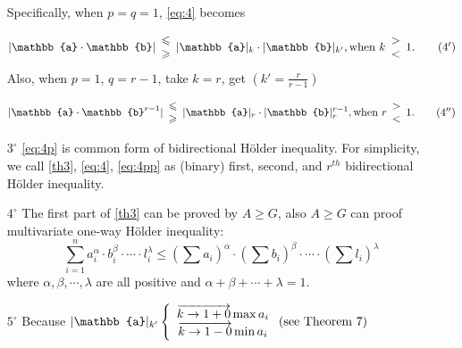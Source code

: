 \documentclass[12pt,a4paper,reqno]{amsart}
\theoremstyle{plain}
\theoremstyle{definition}
\begin{document}
\begin{enumerate}
Specifically, when $p=q=1$, \eqref{eq:4} becomes 

\begin{equation}\label{eq:4p}
  | \mathbb{a}\cdot\mathbb{b}|\begin{array}{c}
  \leqslant \\ 
  \geqslant    
  \end{array}
  |\mathbb{a}|_k \cdot | \mathbb{b}|_{k'}, \textnormal{when}~k
  \begin{array}{l}
    >  \\  
    <      
  \end{array}
  1.  \tag{$4'$} 
\end{equation}
Also, when $p=1$, $q=r-1$, take $k=r$, get $(k'=\frac{r}{r-1})$ 

\begin{equation}\label{eq:4pp}
  | \mathbb{a}\cdot\mathbb{b}^{r-1}|\begin{array}{c}
  \leqslant \\ 
  \geqslant    
  \end{array}
  |\mathbb{a}|_r \cdot | \mathbb{b}|_r^{r-1}, \textnormal{when}~r
  \begin{array}{l}
    >  \\  
    <      
  \end{array}
  1.  \tag{$4''$} 
\end{equation}

\item [$3^{\circ}$] \eqref{eq:4p} is common form of bidirectional H\"older inequality. For simplicity, we call \eqref{th3}, \eqref{eq:4}, \eqref{eq:4pp} as (binary) first, second, and $r^{th}$ bidirectional H\"older inequality.  

\item [$4^{\circ}$] The first part of \eqref{th3} can be proved by $A\geqslant G$, also $A\geqslant G$ can proof multivariate one-way H\"older inequality:
\begin{equation}\label{eq:4}
  \sum_{i=1}^n a_i^{\alpha}\cdot b_i^{\beta}\cdot \cdots \cdot l_i^{\lambda} \leqslant\left(\sum a_i\right)^{\alpha} \cdot \left(\sum b_i\right)^{\beta}\cdot \cdots \cdot \left(\sum l_i\right)^{\lambda}
\end{equation}
where $\alpha, \beta, \cdots, \lambda$ are all positive and $\alpha + \beta + \cdots + \lambda = 1$. 

\item [$5^{\circ}$] Because $|\mathbb{a}|_{k'} \left\{ \begin{array}{c}
  \overrightarrow{k\to 1+0} \max a_i \\ 
  \overrightarrow{k\to 1-0} \min a_i \end{array}\right.  \textnormal{(see Theorem 7)}$


\end{enumerate}
\end{document}
